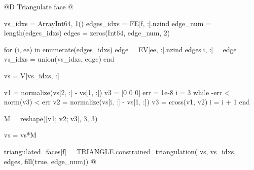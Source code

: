 @D Triangulate face
@{vs_idxs = Array{Int64, 1}()
edges_idxs = FE[f, :].nzind
edge_num = length(edges_idxs)
edges = zeros(Int64, edge_num, 2)

for (i, ee) in enumerate(edges_idxs)
    edge = EV[ee, :].nzind
    edges[i, :] = edge
    vs_idxs = union(vs_idxs, edge)
end

vs = V[vs_idxs, :]

v1 = normalize(vs[2, :] - vs[1, :])
v3 = [0 0 0]
err = 1e-8
i = 3
while -err < norm(v3) < err
    v2 = normalize(vs[i, :] - vs[1, :])
    v3 = cross(v1, v2)
    i = i + 1
end

M = reshape([v1; v2; v3], 3, 3)

vs = vs*M

triangulated_faces[f] = TRIANGLE.constrained_triangulation(
    vs, vs_idxs, edges, fill(true, edge_num))
@}